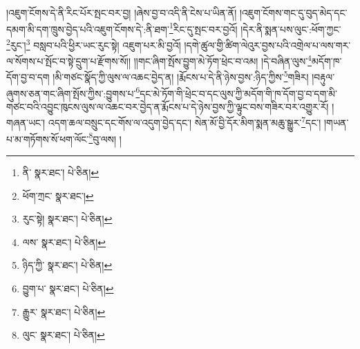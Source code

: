 །འཇུག་ངོགས་དེ་ནི་རིང་པོར་སྤང་བར་བྱ། །ཞེས་བྱ་བ་འདི་ནི་ངེས་པ་ཡིན་ནོ། །འཇུག་ངོགས་གང་དུ་བུད་མེད་དང་དམག་མི་དག་ཁྲུས་བྱེད་པའི་འཇུག་ངོགས་དེ་:ནི་ཐག་\footnote{ནི་  སྣར་ཐང་།  པེ་ཅིན། }རིང་དུ་སྤང་བར་བྱའོ། །དེར་ནི་སྨན་པས་ལུང་:ཕོག་ཀྱང་\footnote{ཕོག་ཀྲང་  སྣར་ཐང་། }རུང་།\footnote{རུང་སྟེ།  སྣར་ཐང་།  པེ་ཅིན། } བསླབ་པའི་ཕྱིར་ཡང་རུང་སྟེ། འཇུག་པར་མི་བྱའོ། །དགེ་ཚུལ་གྱི་ཚིག་ལེའུར་བྱས་པའི་འགྲེལ་པ་ལས་གར་ལ་སོགས་པ་སྤོང་བ་སྟེ་དྲུག་པ་རྫོགས་སོ།། །།གང་ཞིག་སྤོས་བྱུག་མེ་ཏོག་ཕྲེང་བ་འམ། །དེ་བཞིན་ལུས་\footnote{ལས་  སྣར་ཐང་།  པེ་ཅིན། }མདོག་ཁ་དོག་བྱ་བ་དག །མི་གཙང་སྣོད་ཀྱི་ལུས་ལ་འཆང་བྱེད་ན། །རྨོངས་པ་དེ་ནི་ཉེས་བྱས་:ཉིད་ཀྱིས་\footnote{ཉིད་ཀྱི་  སྣར་ཐང་།  པེ་ཅིན། }གཟིར། །བརྟུལ་ཞུགས་ཅན་གང་ཞིག་སྤོས་ཀྱིས་:བྱུགས་པ་\footnote{བྱུག་པ་  སྣར་ཐང་།  པེ་ཅིན། }དང་མེ་ཏོག་གི་ཕྲེང་བ་དང་ལུས་ཀྱི་མདོག་གི་ཁ་དོག་བྱ་བ་དག་མི་གཙང་བའི་འབྱུང་ཁུངས་ལུས་ལ་འཆང་བར་བྱེད་ན་རྨོངས་པ་དེ་ཉེས་བྱས་ཀྱི་ལྟུང་བས་གཟིར་བར་འགྱུར་རོ། །གཞན་ཡང་། འདག་ཆལ་བསྲུང་དང་གོས་ལ་འདུག་བྱེད་དང་། སེན་མོ་བྱི་དོར་མིག་སྨན་མཆུ་སྒྱུར་\footnote{རྒྱུར་  སྣར་ཐང་།  པེ་ཅིན། }དང་། །གཡན་པ་མ་གཏོགས་སོ་ཕག་ལོང་\footnote{ལུང་  སྣར་ཐང་།  པེ་ཅིན། }བུ་ལས། །
